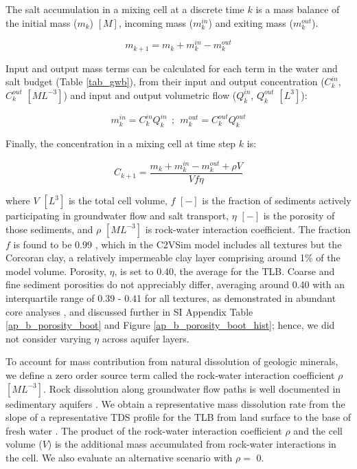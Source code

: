 The salt accumulation in a mixing cell at a discrete time $k$ is a mass balance of the initial mass ($m_k$) $[M]$, incoming mass ($m_k^{in}$) and exiting mass ($m_k^{out}$).  

\begin{equation}
m_{k+1} = m_k + m_k^{in} - m_k^{out}
\label{eq: mass_balance}
\end{equation}  

Input and output mass terms can be calculated for each term in the water and salt budget (Table \ref{tab_gwb}), from their input and output concentration ($C_k^{in}$, $C_k^{out}$ $[ML^{-3}]$) and input and output volumetric flow ($Q_k^{in}$, $Q_k^{out}$ $[L^3]$):

\begin{equation}
m_k^{in} = C_k^{in} Q_k^{in}   \: \: ; \: \:  m_k^{out} = C_k^{out} Q_k^{out}
\label{eq: m_in_cell}
\end{equation}

Finally, the concentration in a mixing cell at time step $k$ is:

\begin{equation}
C_{k+1} = \frac{m_k + m_k^{in} - m_k^{out} + \rho V}{V f \eta}
\label{eq: c_in_cell}
\end{equation}


where $V$ $[L^3]$ is the total cell volume, $f$ $[-]$ is the fraction of sediments actively participating in groundwater flow and salt transport, $\eta$ $[-]$ is the porosity of those sediments, and $\rho$ $[ML^{-3}]$ is rock-water interaction coefficient. The fraction $f$ is found to be 0.99 \citep{Brush2013}, which in the C2VSim model includes all textures but the Corcoran clay, a relatively impermeable clay layer comprising around 1\% of the model volume. Porosity, $\eta$, is set to 0.40, the average for the TLB. Coarse and fine sediment porosities do not appreciably differ, averaging around 0.40 with an interquartile range of 0.39 - 0.41 for all textures, as demonstrated in abundant core analyses \citep{Johnson1968}, and discussed further in SI Appendix Table \ref{ap_b_porosity_boot} and Figure \ref{ap_b_porosity_boot_hist}; hence, we did not consider varying $\eta$ across aquifer layers. 

To account for mass contribution from natural dissolution of geologic minerals, we define a zero order source term called the rock-water interaction coefficient $\rho$ $[ML^{-3}]$. Rock dissolution along groundwater flow paths is well documented in sedimentary aquifers \citep{palmer1984geochemical, oetting1996regional, toth1999groundwater, mahlknecht2004groundwater, cloutier2008multivariate}. We obtain a representative mass dissolution rate from the slope of a representative TDS profile for the TLB from land surface to the base of fresh water \citep{Williamson1989, Kang2016}. The product of the rock-water interaction coefficient $\rho$ and the cell volume ($V$) is the additional mass accumulated from rock-water interactions in the cell. We also evaluate an alternative scenario with $\rho =$ 0. 

